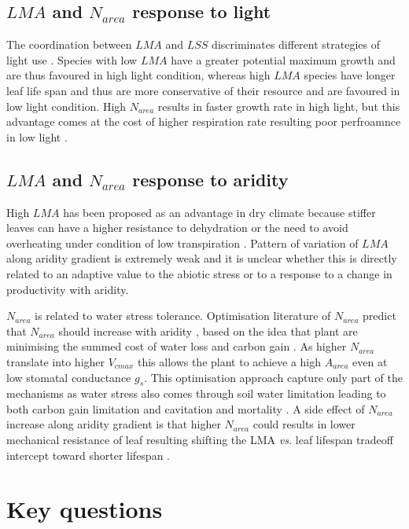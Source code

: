 \documentclass[a4paper,11pt]{article}
\begin{document}
\subsection{$LMA$ and $N_{area}$ response to light}
The coordination between $LMA$ and $LSS$ discriminates different strategies of light use \citep{Falster-2018}. Species with low $LMA$ have a greater potential maximum growth and are thus favoured in high light condition, whereas high $LMA$ species have longer leaf life span and thus are more conservative of their resource and are favoured in low light condition. High $N_{area}$ results in faster growth rate in high light, but this advantage comes at the cost of higher respiration rate resulting poor perfroamnce in low light \citep{Falster-2018}.
 
\subsection{$LMA$ and $N_{area}$ response to aridity}

High $LMA$ has been proposed as an advantage in dry climate because
stiffer leaves can have a higher resistance to dehydration
\citep{Wright-2002a,Wright-2002b} or the need to avoid overheating
under condition of low transpiration \citep{Leigh-2012}.
Pattern of variation of $LMA$ along aridity gradient is extremely weak and it is unclear whether this is directly related to an adaptive value to the abiotic stress or to a response to a change in productivity with aridity.
 
$N_{area}$ is related to water stress tolerance. Optimisation literature of $N_{area}$ predict that $N_{area}$ should
increase with aridity \citep{Wright-2003}, based on the idea that plant are minimising the summed cost of water
loss and carbon gain
\citep{Medlyn-2002,Wright-2003,Prentice-2014,Lu-2016,Wang-2017,Dong-2017}. As
higher $N_{area}$ translate into higher $V_{cmax}$ this allows the
plant to achieve a high $A_{area}$ even at low stomatal conductance
$g_s$. This optimisation approach capture only part of the mechanisms as water stress also comes through soil water limitation leading to both carbon gain limitation and cavitation and mortality \citep{Sperry-2016,Wolf-2016,Sperry-2017}. A side effect of $N_{area}$ increase along aridity gradient is that higher $N_{area}$ could results in lower mechanical resistance of leaf resulting shifting the LMA \textit{vs.} leaf lifespan tradeoff intercept toward shorter lifespan \citep{Wright-2002a}.

\section{Key questions}
\end{document}
